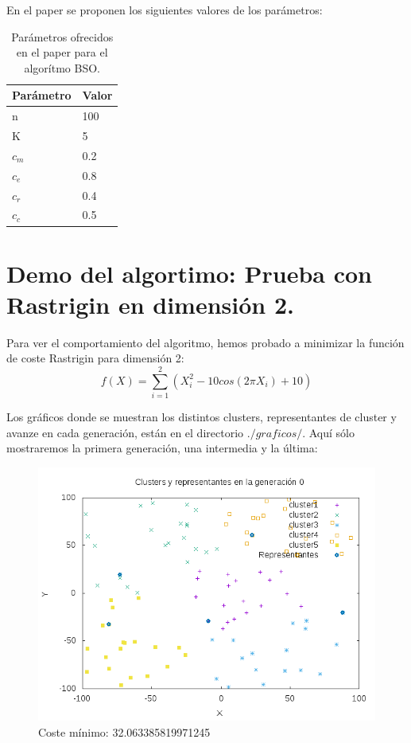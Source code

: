En el  paper se proponen los siguientes valores de los parámetros:\\

\begin{table}[htbp]
	\begin{center}
		\begin{tabular}{|l|l|}
			\hline
			Parámetro & Valor \\
			\hline \hline
			n & 100\\ \hline
			K & 5\\ \hline
			$c_m$ & 0.2\\ \hline
			$c_e$ & 0.8\\ \hline
			$c_r$ & 0.4\\ \hline
			$c_c$ & 0.5\\ \hline
			
		\end{tabular}
		\caption{Parámetros ofrecidos en el paper para el algorítmo BSO.}
		\label{tabla:}
	\end{center}
\end{table}




\newpage

\section{Demo del algortimo: Prueba con Rastrigin en dimensión 2.}

Para ver el comportamiento del algoritmo, hemos probado a minimizar la función de coste Rastrigin para dimensión 2:\\

\[f(X)=\sum_{i=1}^{2}(X_i^2-10cos(2\pi X_i)+10)\]

Los gráficos donde se muestran los distintos clusters, representantes de cluster y avanze en cada generación, están en el directorio $./graficos/$. Aquí sólo mostraremos la primera generación, una intermedia y la última:\\

\begin{figure}[H]
\centering
\includegraphics[width=0.7\linewidth]{graficos/0out}
\caption{Coste mínimo: 32.063385819971245}
\label{fig:0out}
\end{figure}

